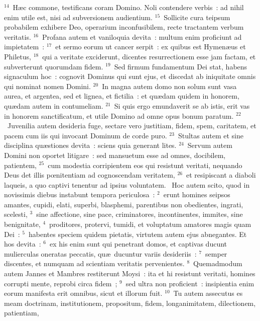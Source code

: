 ${}^{14}$~H\ae c commone, testificans coram Domino. Noli contendere verbis~: ad nihil enim utile est, nisi ad subversionem audientium.
${}^{15}$~Sollicite cura teipsum probabilem exhibere Deo, operarium inconfusibilem, recte tractantem verbum veritatis.
${}^{16}$~Profana autem et vaniloquia devita~: multum enim proficiunt ad impietatem~:
${}^{17}$~et sermo eorum ut cancer serpit~: ex quibus est Hymen\ae us et Philetus,
${}^{18}$~qui a veritate exciderunt, dicentes resurrectionem esse jam factam, et subverterunt quorumdam fidem.
${}^{19}$~Sed firmum fundamentum Dei stat, habens signaculum hoc~: cognovit Dominus qui sunt ejus, et discedat ab iniquitate omnis qui nominat nomen Domini.
${}^{20}$~In magna autem domo non solum sunt vasa aurea, et argentea, sed et lignea, et fictilia~: et qu\ae dam quidem in honorem, qu\ae dam autem in contumeliam.
${}^{21}$~Si quis ergo emundaverit se ab istis, erit vas in honorem sanctificatum, et utile Domino ad omne opus bonum paratum.
${}^{22}$~Juvenilia autem desideria fuge, sectare vero justitiam, fidem, spem, caritatem, et pacem cum iis qui invocant Dominum de corde puro.
${}^{23}$~Stultas autem et sine disciplina qu\ae stiones devita~: sciens quia generant lites.
${}^{24}$~Servum autem Domini non oportet litigare~: sed mansuetum esse ad omnes, docibilem, patientem,
${}^{25}$~cum modestia corripientem eos qui resistunt veritati, nequando Deus det illis pœnitentiam ad cognoscendam veritatem,
${}^{26}$~et resipiscant a diaboli laqueis, a quo captivi tenentur ad ipsius voluntatem.
~\lettrine[lines=10,image=true,loversize=0.05,lraise=-0.03]{H}{}oc autem scito, quod in novissimis diebus instabunt tempora periculosa~:
${}^{2}$~erunt homines seipsos amantes, cupidi, elati, superbi, blasphemi, parentibus non obedientes, ingrati, scelesti,
${}^{3}$~sine affectione, sine pace, criminatores, incontinentes, immites, sine benignitate,
${}^{4}$~proditores, protervi, tumidi, et voluptatum amatores magis quam Dei~:
${}^{5}$~habentes speciem quidem pietatis, virtutem autem ejus abnegantes. Et hos devita~:
${}^{6}$~ex his enim sunt qui penetrant domos, et captivas ducunt mulierculas oneratas peccatis, qu\ae\ ducuntur variis desideriis~:
${}^{7}$~semper discentes, et numquam ad scientiam veritatis pervenientes.
${}^{8}$~Quemadmodum autem Jannes et Mambres restiterunt Moysi~: ita et hi resistunt veritati, homines corrupti mente, reprobi circa fidem~;
${}^{9}$~sed ultra non proficient~: insipientia enim eorum manifesta erit omnibus, sicut et illorum fuit.
${}^{10}$~Tu autem assecutus es meam doctrinam, institutionem, propositum, fidem, longanimitatem, dilectionem, patientiam,
